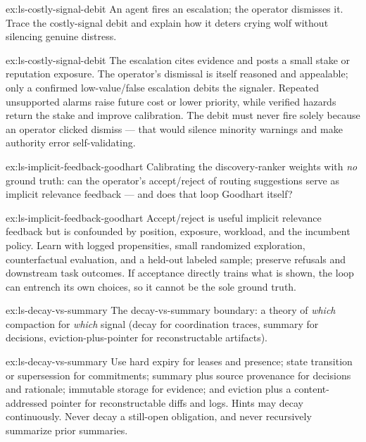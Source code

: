 \documentclass[11pt,a4paper]{article}
\theoremstyle{definition}
\theoremstyle{plain}
\begin{document}
\begin{pdexercise}[kind=Trace,rating=2]{ex:ls-costly-signal-debit}
An agent fires an escalation; the operator dismisses it. Trace the costly-signal
debit and explain how it deters crying wolf without silencing genuine distress.
\end{pdexercise}
\begin{pdsolution}{ex:ls-costly-signal-debit}
The escalation cites evidence and posts a small stake or reputation exposure. The operator's dismissal is itself reasoned and appealable; only a confirmed low-value/false escalation debits the signaler. Repeated unsupported alarms raise future cost or lower priority, while verified hazards return the stake and improve calibration. The debit must never fire solely because an operator clicked dismiss --- that would silence minority warnings and make authority error self-validating.
\end{pdsolution}
\begin{pdexercise}[kind=Open,rating=3]{ex:ls-implicit-feedback-goodhart}
Calibrating the discovery-ranker weights with \emph{no} ground
truth: can the operator's accept/reject of routing suggestions serve as implicit
relevance feedback --- and does that loop Goodhart itself?
\end{pdexercise}
\begin{pdsolution}{ex:ls-implicit-feedback-goodhart}
Accept/reject is useful implicit relevance feedback but is confounded by position, exposure, workload, and the incumbent policy. Learn with logged propensities, small randomized exploration, counterfactual evaluation, and a held-out labeled sample; preserve refusals and downstream task outcomes. If acceptance directly trains what is shown, the loop can entrench its own choices, so it cannot be the sole ground truth.
\end{pdsolution}
\begin{pdexercise}[kind=Open,rating=3]{ex:ls-decay-vs-summary}
The
decay-vs-summary boundary: a theory of \emph{which} compaction for \emph{which}
signal (decay for coordination traces, summary for decisions,
eviction-plus-pointer for reconstructable artifacts).
\end{pdexercise}
\begin{pdsolution}{ex:ls-decay-vs-summary}
Use hard expiry for leases and presence; state transition or supersession for commitments; summary plus source provenance for decisions and rationale; immutable storage for evidence; and eviction plus a content-addressed pointer for reconstructable diffs and logs. Hints may decay continuously. Never decay a still-open obligation, and never recursively summarize prior summaries.
\end{pdsolution}
\end{document}
